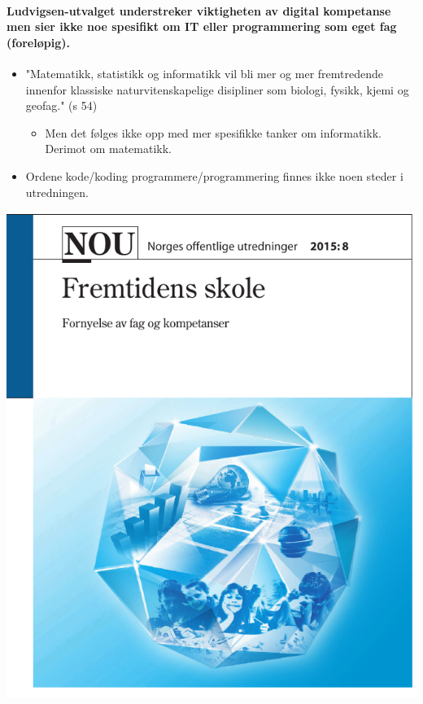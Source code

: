 \documentclass[%
oneside,                 %
final,                   %
10pt,norsk]{article}
\begin{document}
\noindent

\paragraph{Ludvigsen-utvalget understreker viktigheten av digital kompetanse men sier ikke noe spesifikt om IT eller programmering som eget fag (foreløpig).}
\begin{itemize}
\item "Matematikk, statistikk og informatikk vil bli mer og mer fremtredende innenfor klassiske naturvitenskapelige disipliner som biologi, fysikk, kjemi og geofag." (s 54)
\begin{itemize}

 \item Men det følges ikke opp med mer spesifikke tanker om informatikk. Derimot om matematikk.

\end{itemize}

\noindent
\item Ordene kode/koding programmere/programmering finnes ikke noen steder i utredningen.
\end{itemize}

\noindent


\centerline{\includegraphics[width=0.9\linewidth]{fig/ludvigsen.png}}
\end{document}
